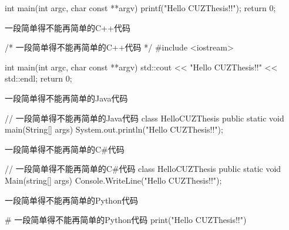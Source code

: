 \begin{appendices}
\begin{listing}[H]
\begin{ccode}
            int main(int argc, char const **argv) {
                printf("Hello CUZThesis!!\n");
                return 0;
            }
        \end{ccode}
    \end{listing}

    \begin{listing}[H]
        \centering
        \caption{一段简单得不能再简单的C++代码}
        \label{code:samp-code-cpp}
        \begin{cppcode}
            /* 一段简单得不能再简单的C++代码 */
            #include <iostream>

            int main(int argc, char const **argv) {
                std::cout << "Hello CUZThesis!!" << std::endl;
                return 0;
            }
        \end{cppcode}   
    \end{listing}

    \begin{listing}[H]
        \centering
        \caption{一段简单得不能再简单的Java代码}
        \label{code:samp-code-java}
        \begin{javacode}
            // 一段简单得不能再简单的Java代码
            class HelloCUZThesis {
                public static void main(String[] args) {
                    System.out.println("Hello CUZThesis!!");
                }
            }
        \end{javacode}
    \end{listing}

    \begin{listing}[H]
        \centering
        \caption{一段简单得不能再简单的C\#代码}
        \label{code:samp-code-csharp}
        \begin{csharpcode}
            // 一段简单得不能再简单的C#代码
            class HelloCUZThesis {
                public static void Main(string[] args) {
                    Console.WriteLine("Hello CUZThesis!!");
                }
            }
        \end{csharpcode}
    \end{listing}

    \begin{listing}[H]
        \centering
        \caption{一段简单得不能再简单的Python代码}
        \label{code:samp-code-python}
        \begin{pythoncode}
            # 一段简单得不能再简单的Python代码
            print("Hello CUZThesis!!")
        \end{pythoncode}
    \end{listing}


\end{appendices}
